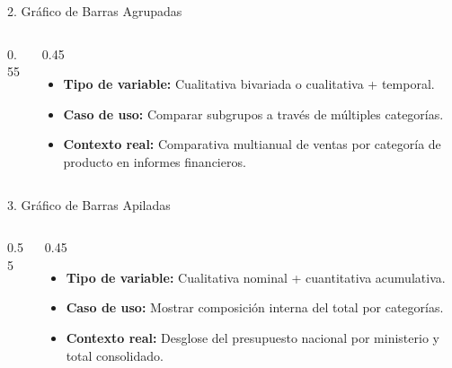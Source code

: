 \documentclass[aspectratio=169,10pt]{beamer}
\begin{document}
\begin{frame}{2. Gráfico de Barras Agrupadas}
\begin{columns}
\begin{column}{0.55\textwidth}
\end{column}
\begin{column}{0.45\textwidth}
\begin{itemize}\small
\item \textbf{Tipo de variable:} Cualitativa bivariada o cualitativa + temporal.
\item \textbf{Caso de uso:} Comparar subgrupos a través de múltiples categorías.
\item \textbf{Contexto real:} Comparativa multianual de ventas por categoría de producto en informes financieros.
\end{itemize}
\end{column}
\end{columns}
\end{frame}

\begin{frame}{3. Gráfico de Barras Apiladas}
\begin{columns}
\begin{column}{0.55\textwidth}
\end{column}
\begin{column}{0.45\textwidth}
\begin{itemize}\small
\item \textbf{Tipo de variable:} Cualitativa nominal + cuantitativa acumulativa.
\item \textbf{Caso de uso:} Mostrar composición interna del total por categorías.
\item \textbf{Contexto real:} Desglose del presupuesto nacional por ministerio y total consolidado.
\end{itemize}
\end{column}
\end{columns}
\end{frame}
\end{document}
